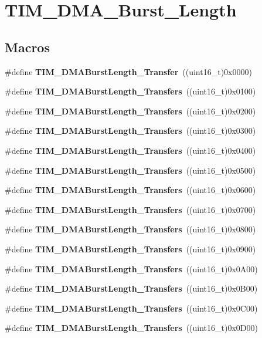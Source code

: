 \section{T\+I\+M\+\_\+\+D\+M\+A\+\_\+\+Burst\+\_\+\+Length}
\label{group__TIM__DMA__Burst__Length}
\subsection*{Macros}
\begin{DoxyCompactItemize}
\item 
\#define \textbf{ T\+I\+M\+\_\+\+D\+M\+A\+Burst\+Length\+\_\+Transfer}~((uint16\+\_\+t)0x0000)
\item 
\#define \textbf{ T\+I\+M\+\_\+\+D\+M\+A\+Burst\+Length\+\_\+Transfers}~((uint16\+\_\+t)0x0100)
\item 
\#define \textbf{ T\+I\+M\+\_\+\+D\+M\+A\+Burst\+Length\+\_\+Transfers}~((uint16\+\_\+t)0x0200)
\item 
\#define \textbf{ T\+I\+M\+\_\+\+D\+M\+A\+Burst\+Length\+\_\+Transfers}~((uint16\+\_\+t)0x0300)
\item 
\#define \textbf{ T\+I\+M\+\_\+\+D\+M\+A\+Burst\+Length\+\_\+Transfers}~((uint16\+\_\+t)0x0400)
\item 
\#define \textbf{ T\+I\+M\+\_\+\+D\+M\+A\+Burst\+Length\+\_\+Transfers}~((uint16\+\_\+t)0x0500)
\item 
\#define \textbf{ T\+I\+M\+\_\+\+D\+M\+A\+Burst\+Length\+\_\+Transfers}~((uint16\+\_\+t)0x0600)
\item 
\#define \textbf{ T\+I\+M\+\_\+\+D\+M\+A\+Burst\+Length\+\_\+Transfers}~((uint16\+\_\+t)0x0700)
\item 
\#define \textbf{ T\+I\+M\+\_\+\+D\+M\+A\+Burst\+Length\+\_\+Transfers}~((uint16\+\_\+t)0x0800)
\item 
\#define \textbf{ T\+I\+M\+\_\+\+D\+M\+A\+Burst\+Length\+\_\+Transfers}~((uint16\+\_\+t)0x0900)
\item 
\#define \textbf{ T\+I\+M\+\_\+\+D\+M\+A\+Burst\+Length\+\_\+Transfers}~((uint16\+\_\+t)0x0\+A00)
\item 
\#define \textbf{ T\+I\+M\+\_\+\+D\+M\+A\+Burst\+Length\+\_\+Transfers}~((uint16\+\_\+t)0x0\+B00)
\item 
\#define \textbf{ T\+I\+M\+\_\+\+D\+M\+A\+Burst\+Length\+\_\+Transfers}~((uint16\+\_\+t)0x0\+C00)
\item 
\#define \textbf{ T\+I\+M\+\_\+\+D\+M\+A\+Burst\+Length\+\_\+Transfers}~((uint16\+\_\+t)0x0\+D00)

\end{DoxyCompactItemize}
